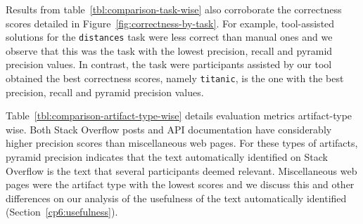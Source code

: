 Results from table~\ref{tbl:comparison-task-wise} also corroborate 
the correctness scores detailed in Figure~\ref{fig:correctness-by-task}. For example, 
tool-assisted solutions for the \texttt{distances} task were less correct than manual ones and 
we observe that this was the task with the lowest precision, recall and pyramid precision values. 
In contrast, the task were participants assisted by our tool obtained the best correctness scores, namely \texttt{titanic}, is the one with the best precision, recall and pyramid precision values.









Table~\ref{tbl:comparison-artifact-type-wise} details evaluation metrics artifact-type wise. 
Both Stack Overflow posts and API documentation have considerably higher precision scores than 
miscellaneous web pages. For these types of artifacts, pyramid precision indicates that the 
text automatically identified on Stack Overflow is the text that several participants deemed relevant. Miscellaneous web pages were the artifact type with the lowest scores and we 
discuss this and other differences on our analysis of the usefulness of the text 
automatically identified (Section~\ref{cp6:usefulness}).










